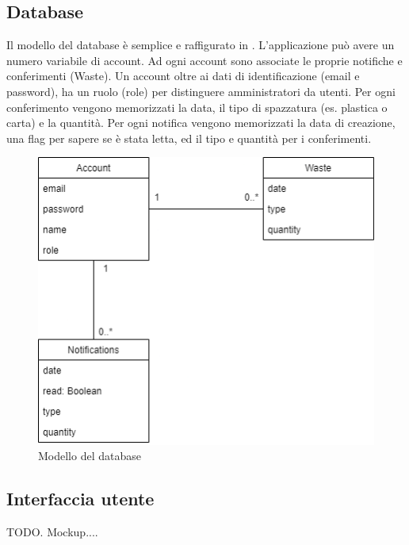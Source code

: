\documentclass{report}
\begin{document}
\subsection{Database}
Il modello del database è semplice e raffigurato in . L'applicazione può avere un numero variabile di account.
Ad ogni account sono associate le proprie notifiche e conferimenti (Waste). Un account oltre ai dati di identificazione
(email e password), ha un ruolo (role) per distinguere amministratori da utenti. Per ogni conferimento vengono memorizzati
la data, il tipo di spazzatura (es. plastica o carta) e la quantità. Per ogni notifica vengono memorizzati la data di creazione,
una flag per sapere se è stata letta, ed il tipo e quantità per i conferimenti.
\begin{figure}[h!]
    \centering
    \includegraphics[width=\textwidth]{db}
    \caption{Modello del database}
    \label{fig:db}
\end{figure}

\subsection{Interfaccia utente}
TODO. Mockup....
\end{document}

